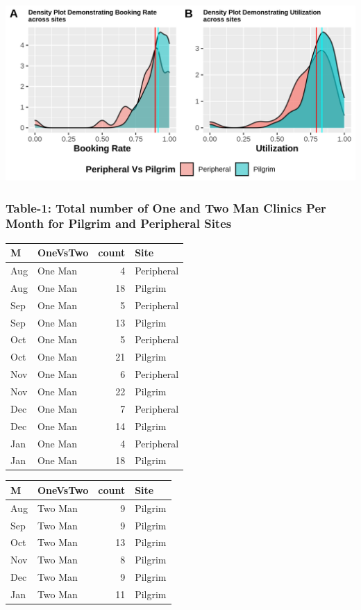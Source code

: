 \documentclass[]{article}
\begin{document}
\begin{center}\includegraphics{LF2_files/figure-latex/unnamed-chunk-3-1} \end{center}

\hypertarget{table-1-total-number-of-one-and-two-man-clinics-per-month-for-pilgrim-and-peripheral-sites}{%
\subsubsection{Table-1: Total number of One and Two Man Clinics Per
Month for Pilgrim and Peripheral
Sites}\label{table-1-total-number-of-one-and-two-man-clinics-per-month-for-pilgrim-and-peripheral-sites}}

\begin{table}

\centering
\begin{tabular}[t]{llrl}
\toprule
M & OneVsTwo & count & Site\\
\midrule
Aug & One Man & 4 & Peripheral\\
Aug & One Man & 18 & Pilgrim\\
Sep & One Man & 5 & Peripheral\\
Sep & One Man & 13 & Pilgrim\\
Oct & One Man & 5 & Peripheral\\
\addlinespace
Oct & One Man & 21 & Pilgrim\\
Nov & One Man & 6 & Peripheral\\
Nov & One Man & 22 & Pilgrim\\
Dec & One Man & 7 & Peripheral\\
Dec & One Man & 14 & Pilgrim\\
\addlinespace
Jan & One Man & 4 & Peripheral\\
Jan & One Man & 18 & Pilgrim\\
\bottomrule
\end{tabular}
\centering
\begin{tabular}[t]{llrl}
\toprule
M & OneVsTwo & count & Site\\
\midrule
Aug & Two Man & 9 & Pilgrim\\
Sep & Two Man & 9 & Pilgrim\\
Oct & Two Man & 13 & Pilgrim\\
Nov & Two Man & 8 & Pilgrim\\
Dec & Two Man & 9 & Pilgrim\\
\addlinespace
Jan & Two Man & 11 & Pilgrim\\
\bottomrule
\end{tabular}
\end{table}
\end{document}
